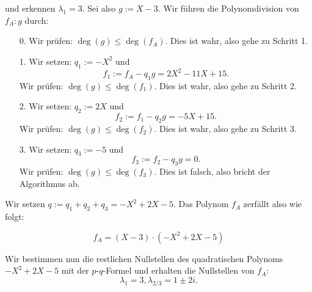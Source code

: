 \documentclass{article}
\begin{document}
und erkennen $\lambda_1 = 3$. Sei also $g := X - 3$.
Wir führen die Polynomdivision von $f_A:g$ durch:

\begin{enumerate}
    \item[0.] Wir prüfen: $\deg(g) \leq \deg(f_A)$. Dies ist wahr, also gehe zu Schritt 1.
    
    \item[1.] Wir setzen: $q_1 := -X^2$ und 
    \[
    f_1 := f_A - q_1 g  = 2X^2 - 11X + 15.
    \]
    Wir prüfen: $\deg(g) \leq \deg(f_1)$. Dies ist wahr, also gehe zu Schritt 2.
    
    \item[2.] Wir setzen: $q_2 := 2X$ und 
    \[
    f_2 := f_1 - q_2 g = -5X + 15.
    \]
    Wir prüfen: $\deg(g) \leq \deg(f_2)$. Dies ist wahr, also gehe zu Schritt 3.
    
    \item[3.] Wir setzen: $q_3 := -5$ und 
    \[
    f_3 := f_2 - q_3 g =  0.
    \]
    Wir prüfen: $\deg(g) \leq \deg(f_3)$. Dies ist falsch, also bricht der Algorithmus ab.
\end{enumerate}

Wir setzen $q := q_1 + q_2 + q_3 = -X^2 + 2X - 5$.
Das Polynom $f_A$ zerfällt also wie folgt:

\[
f_A = (X - 3)\cdot(-X^2 + 2X - 5)
\]

Wir bestimmen nun die restlichen Nullstellen
des quadratischen Polynoms $-X^2 + 2X - 5$
mit der $p$-$q$-Formel und erhalten die Nullstellen
von $f_A$:
\[
\lambda_1 = 3, \lambda_{2/3} = 1 \pm 2i.
\]
\end{document}
